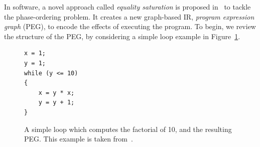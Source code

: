In software, a novel approach called \emph{equality saturation} is proposed
in~\cite{tate09} to tackle the phase-ordering problem.  It creates a new
graph-based IR, \emph{program expression graph} (PEG), to encode the effects
of executing the program.  To begin, we review the structure of the PEG, by
considering a simple loop example in Figure~\ref{bg:fig:factorial}.
\begin{figure}[ht]
    \newsavebox{\factlstbox}
    \begin{lrbox}{\factlstbox}
    \begin{lstlisting}
x = 1;
y = 1;
while (y <= 10)
{
    x = y * x;
    y = y + 1;
}
    \end{lstlisting}
    \end{lrbox}
    \centering
    \caption{%
        A simple loop which computes the factorial of 10, and the resulting
        PEG\@.  This example is taken from~\cite{tate09}.
    }\label{bg:fig:factorial}
\end{figure}

